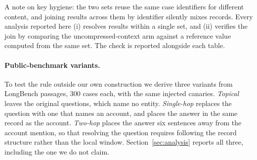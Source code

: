 A note on key hygiene: the two sets reuse the same case identifiers for different content,
and joining results across them by identifier silently mixes records. Every analysis
reported here (i) resolves results within a single set, and (ii) verifies the join by
comparing the uncompressed-context arm against a reference value computed from the same set.
The check is reported alongside each table.

\paragraph{Public-benchmark variants.}
To test the rule outside our own construction we derive three variants from LongBench
passages, $300$ cases each, with the same injected canaries. \emph{Topical} leaves the
original questions, which name no entity. \emph{Single-hop} replaces the question with one
that names an account, and places the answer in the same record as the account.
\emph{Two-hop} places the answer six sentences away from the account mention, so that
resolving the question requires following the record structure rather than the local
window. Section~\ref{sec:analysis} reports all three, including the one we do not claim.
